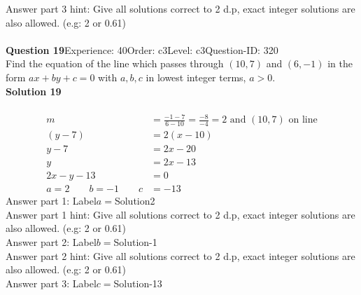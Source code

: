 \documentclass{article}
\begin{document}
Answer part 3 hint: \hspace{15pt}Give all solutions correct to 2 d.p, exact integer solutions are also allowed. (e.g: 2 or 0.61)\\
\\[4pt]
\noindent\textbf{Question 19}\hspace{20pt}Experience: 40\hspace{20pt}Order: c3\hspace{20pt}Level: c3\hspace{20pt}Question-ID: 320\\[2pt]
Find the equation of the line which passes through $(10,7)$ and $(6,-1)$ in the form $ax+by+c=0$ with $a,b,c$ in lowest integer terms, $a>0$.\\[4pt]
\noindent\textbf{Solution 19}\\[2pt]
\\[-35pt]\begin{align*}
m&=\displaystyle\frac{-1-7}{6-10}=\displaystyle\frac{-8}{-4}=2\,\,\text{and}\,\, (10,7) \,\,\text{on line}\\[2pt]
(y-7)&=2(x-10)\\[2pt]
y-7&=2x-20\\[2pt]
y&=2x-13\\[2pt]
2x-y-13&=0\\[2pt]
a=2\qquad b=-1 \qquad c&=-13
\end{align*}
Answer part 1: \hspace{10pt}Label\hspace{10pt}$a=$\hspace{10pt}Solution\hspace{10pt}2\\
Answer part 1 hint: \hspace{15pt}Give all solutions correct to 2 d.p, exact integer solutions are also allowed. (e.g: 2 or 0.61)\\
Answer part 2: \hspace{10pt}Label\hspace{10pt}$b=$\hspace{10pt}Solution\hspace{10pt}-1\\
Answer part 2 hint: \hspace{15pt}Give all solutions correct to 2 d.p, exact integer solutions are also allowed. (e.g: 2 or 0.61)\\
Answer part 3: \hspace{10pt}Label\hspace{10pt}$c=$\hspace{10pt}Solution\hspace{10pt}-13\\
\end{document}

